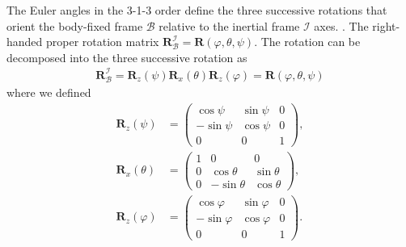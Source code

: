 \documentclass[pdflatex,sn-mathphys-num]{sn-jnl}%
\theoremstyle{thmstyleone}%
\theoremstyle{thmstyletwo}%
\theoremstyle{thmstylethree}%
\renewcommand{\vec}[1]{\boldsymbol{#1}}
\begin{document}
\begin{appendices}

The Euler angles in the 3-1-3 order define the three successive rotations that orient the body-fixed frame $\mathcal{B}$ relative to the inertial frame $\mathcal{I}$ axes.
\citep[see, e.g.,][]{Broucke1990doi:10.2514/3.20591}.
The right-handed proper rotation matrix 
${\vec{R}_{\mathcal{B}}^{\mathcal{I}} = \vec{R}(\varphi,\theta,\psi)}$.
%
The rotation can be decomposed into the three successive rotation as
\begin{align}
\vec{R}_{\mathcal{B}}^{\mathcal{I}}= 
\vec{R}_{z}(\psi)
\vec{R}_{x}(\theta)
\vec{R}_{z}(\varphi)
= \vec{R}(\varphi,\theta,\psi)
\end{align}
%
where we defined
%
\begin{align}
	\vec{R}_{z}(\psi) &= 
\begin{pmatrix}
	\cos\psi & \sin\psi & 0 \\
	-\sin\psi & \cos\psi & 0 \\
	0 & 0 & 1
\end{pmatrix}, \\ %
\vec{R}_{x}(\theta) & =
	\begin{pmatrix}
1 & 0 & 0 \\
0 & \cos\theta & \sin\theta \\
0 & -\sin\theta & \cos\theta
\end{pmatrix}, \\ %
\vec{R}_{z}(\varphi) & =
	\begin{pmatrix}
\cos\varphi & \sin\varphi & 0 \\
-\sin\varphi & \cos\varphi & 0 \\
0 & 0 & 1
\end{pmatrix}.
\end{align}
%



\end{appendices}
\end{document}

